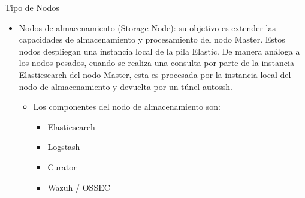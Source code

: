 \begin{subsubsection}{Tipo de Nodos}
\begin{itemize}
\begin{itemize}
\begin{itemize}
                    \item Snort / Suricata
                    \item Netsniff-ng
                    \item Wazuh / OSSEC
                    \item Syslog-ng (envía los logs a la instancia local de Logstash)
                \end{itemize}
            \end{itemize}
            \item Nodos de almacenamiento (Storage Node): su objetivo es extender las capacidades de almacenamiento y procesamiento del nodo Master. Estos nodos despliegan una instancia local de la pila Elastic. De manera análoga a los nodos pesados, cuando se realiza una consulta por parte de la instancia Elasticsearch del nodo Master, esta es procesada por la instancia local del nodo de almacenamiento y devuelta por un túnel autossh.
            \begin{itemize}
                \item Los componentes del nodo de almacenamiento son:
                \begin{itemize}
                    \item Elasticsearch
                    \item Logstash
                    \item Curator
                    \item Wazuh / OSSEC
                \end{itemize}
            \end{itemize}
        \end{itemize}
    \end{subsubsection}
    \pagebreak
